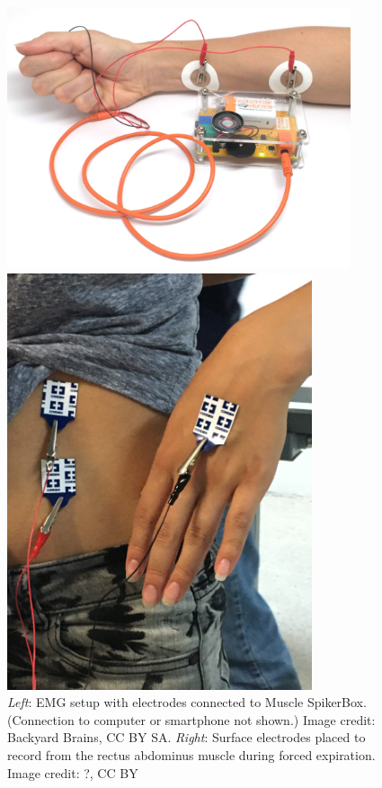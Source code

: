 \documentclass[12pt]{article}
\begin{document}
\begin{enumerate}
\begin{figure}[h!]
\begin{center}
\begin{minipage}{.55\textwidth}
\centering
\includegraphics[width=0.9\textwidth]{images/muscleSpikerBox.jpg}
\end{minipage}%
\begin{minipage}{.4\textwidth}
\centering
\includegraphics[width=0.8\textwidth]{images/electrodeAb.JPG}
\end{minipage}
\end{center}
\caption{\textit{Left}: EMG setup with electrodes connected to Muscle SpikerBox. (Connection to computer or smartphone not shown.) Image credit: Backyard Brains, CC BY SA. \textit{Right}: Surface electrodes placed to record from the rectus abdominus muscle during forced expiration. Image credit: ?, CC BY}
\label{fig:spirAssembly}
\end{figure}


\end{enumerate}
\end{document}
